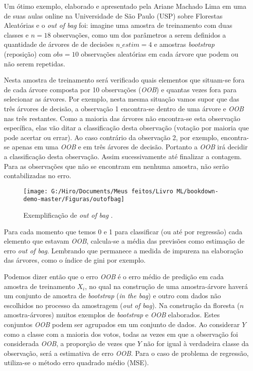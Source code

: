 \documentclass[
]{book}
\begin{document}
Um ótimo exemplo, elaborado e apresentado pela Ariane Machado Lima em uma de suas aulas online na Universidade de São Paulo (USP) sobre Florestas Aleatórias e o \emph{out of bag} foi: imagine uma amostra de treinamento com duas classes e \(n=18\) observações, como um dos parâmetros a serem definidos a quantidade de árvores de de decisões \(n\_estim=4\) e amostras \emph{bootstrap} (reposição) com \(obs=10\) observações aleatórias em cada árvore que podem ou não serem repetidas.

Nesta amostra de treinamento será verificado quais elementos que situam-se fora de cada árvore composta por 10 observações (\emph{OOB}) e quantas vezes fora para selecionar as árvores. Por exemplo, nesta mesma situação vamos supor que das três árvores de decisão, a observação 1 encontra-se dentro de uma árvore e \emph{OOB} nas três restantes. Como a maioria das árvores não encontra-se esta observação específica, elas vão ditar a classificação desta observação (votação por maioria que pode acertar ou errar). Ao caso contrário da observação 2, por exemplo, encontra-se apenas em uma \emph{OOB} e em três árvores de decisão. Portanto a \emph{OOB} irá decidir a classificação desta observação. Assim sucessivamente até finalizar a contagem. Para as observações que não se encontram em nenhuma amostra, não serão contabilizadas no erro.

\begin{figure}

{\centering \texttt{[image: G:/Hiro/Documents/Meus feitos/Livro ML/bookdown-demo-master/Figuras/outofbag]} 

}

\caption{Exemplificação de \emph{out of bag} \citep{machadousprf}.}\label{fig:outofbag}
\end{figure}



Para cada momento que temos 0 e 1 para classificar (ou até por regressão) cada elemento que estavam \emph{OOB}, calcula-se a média das previsões como estimação de erro \emph{out of bag}. Lembrando que permanece a medida de impureza na elaboração das árvores, como o índice de gini por exemplo.

Podemos dizer então que o erro \emph{OOB} é o erro médio de predição em cada amostra de treinamento \(X_i\), no qual na construção de uma amostra-árvore haverá um conjunto de amostra de \emph{bootstrap} (\emph{in the bag}) e outro com dados não escolhidos no processo da amostragem (\emph{out of bag}). Na construção da floresta (\(n\) amostra-árvores) muitos exemplos de \emph{bootstrap} e \emph{OOB} elaborados. Estes conjuntos \emph{OOB} podem ser agrupados em um conjunto de dados. Ao considerar \(Y\) como a classe com a maioria dos votos, todas as vezes em que a observação foi considerada \emph{OOB}, a proporção de vezes que \(Y\) não for igual à verdadeira classe da observação, será a estimativa de erro \emph{OOB}. Para o caso de problema de regressão, utiliza-se o método erro quadrado médio (MSE).
\end{document}
